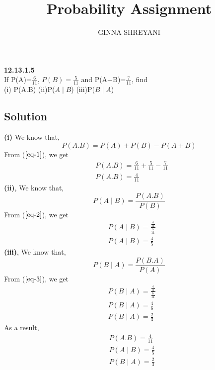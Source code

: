 \documentclass[10pt,twocolumn]{article}
\title{
Probability Assignment
}
\author{GINNA SHREYANI}
\date{}
\begin{document}
\maketitle


\textbf{12.13.1.5}\\
If P(A)=$\frac{6}{11}$, $P(B)=\frac{5}{11}$ and P(A+B)=$\frac{7}{11}$, find\\
(i) P(A.B)   (ii)P($A \mid B$)  (iii)P($B\mid A$)
\subsection*{Solution}
\textbf{(i)} We know that,\\
\begin{equation}
	P(A.B) = P(A) + P(B) -P(A+B)
	\label{eq-1}
\end{equation}
From ($\ref{eq-1}$), we get\\
\begin{align*}
	&P(A.B) = \frac{6}{11} + \frac{5}{11} - \frac{7}{11}\\
	&P(A.B) = \frac{4}{11}
\end{align*}
\textbf{(ii)}, We know that,\\
\begin{equation}
	P(A\mid B) = \frac{P(A.B)}{P(B)}
	\label{eq-2}
\end{equation}
From ($\ref{eq-2}$), we get\\
\begin{align*}
	&P(A \mid B) = \frac{\frac{4}{11}}{\frac{5}{11}}\\
	&P(A\mid B) = \frac{4}{5}
\end{align*}
\textbf{(iii)}, We know that,\\
\begin{equation}
	P(B\mid A)=\frac{P(B.A)}{P(A)}
	\label{eq-3}
\end{equation}
From ($\ref{eq-3}$), we get\\
\begin{align*}
	&P(B\mid A) = \frac{\frac{4}{11}}{\frac{6}{11}}\\
	&P(B\mid A) = \frac{4}{6}\\
	&P(B\mid A) = \frac{2}{3}
\end{align*}
As a result,
\begin{align*}
	&P(A.B) = \frac{4}{11}\\
	&P(A\mid B) = \frac{4}{5}\\
	&P(B\mid A) = \frac{2}{3}
\end{align*}
\end{document}
